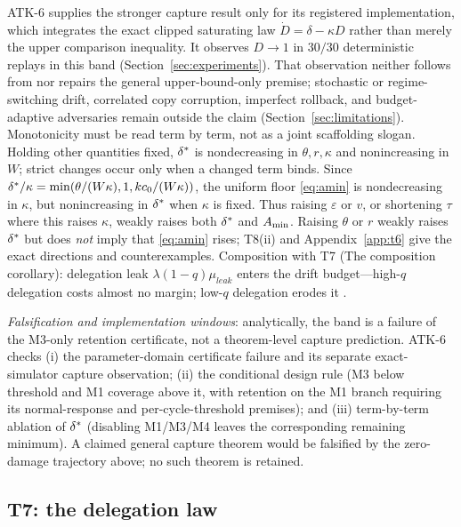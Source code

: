 ATK-6 supplies the stronger capture result only for its registered
implementation, which integrates the exact clipped saturating law
$\dot D=\delta-\kappa D$ rather than merely the upper comparison inequality.
It observes $D\to1$ in $30/30$ deterministic replays in this band
(Section~\ref{sec:experiments}). That observation neither follows from nor
repairs the general upper-bound-only premise; stochastic or regime-switching
drift, correlated copy corruption, imperfect rollback, and budget-adaptive
adversaries remain outside the claim (Section~\ref{sec:limitations}).
Monotonicity must be read term by term, not as a joint scaffolding slogan.
Holding other quantities fixed, $\delta^{*}$ is nondecreasing in
$\theta,r,\kappa$ and nonincreasing in $W$; strict changes occur only when a
changed term binds. Since
$\delta^{*}/\kappa=\min(\theta/(W\kappa),1,kc_0/(W\kappa))$, the uniform
floor \eqref{eq:amin} is nondecreasing in $\kappa$, but nonincreasing in
$\delta^{*}$ when $\kappa$ is fixed. Thus raising $\varepsilon$ or $v$, or
shortening $\tau$ where this raises $\kappa$, weakly raises both
$\delta^{*}$ and $A_{\min}$. Raising $\theta$ or $r$ weakly raises
$\delta^{*}$ but does \emph{not} imply that \eqref{eq:amin} rises; T8(ii)
and Appendix~\ref{app:t6} give the exact directions and counterexamples.
Composition with T7 (The composition corollary): delegation leak
$\lambda(1-q)\mu_{leak}$ enters the drift budget---high-$q$ delegation costs
almost no margin; low-$q$ delegation erodes it \citep{danaher2018}.

\emph{Falsification and implementation windows}: analytically, the band is a
failure of the M3-only retention certificate, not a theorem-level capture
prediction. ATK-6 checks (i) the parameter-domain certificate failure and its
separate exact-simulator capture observation; (ii) the conditional design
rule (M3 below threshold and M1 coverage above it, with retention on the M1
branch requiring its normal-response and per-cycle-threshold premises); and
(iii) term-by-term ablation of $\delta^{*}$ (disabling M1/M3/M4 leaves the corresponding
remaining minimum). A claimed general capture theorem would be falsified by
the zero-damage trajectory above; no such theorem is retained.

\subsection{T7: the delegation law}\label{sec:t7}

